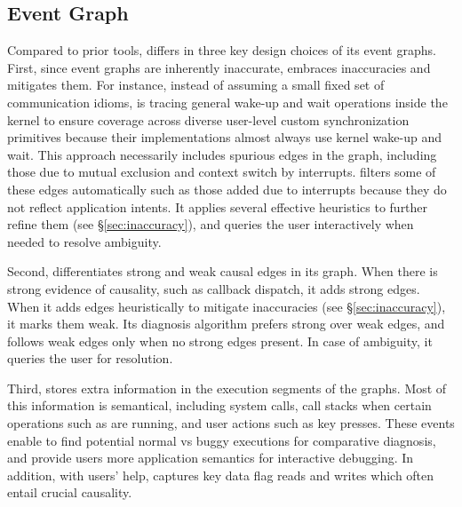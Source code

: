 \subsection{\xxx Event Graph}\label{subsec:eventgraph}

Compared to prior tools, \xxx differs in three key design choices of its
event graphs.  First, since event graphs are inherently inaccurate, \xxx
embraces inaccuracies and mitigates them.  For instance, instead of
assuming a small fixed set of communication idioms, \xxx is tracing
general wake-up and wait operations inside the kernel to ensure coverage
across diverse user-level custom synchronization primitives because their
implementations almost always use kernel wake-up and wait.  This approach
necessarily includes spurious edges in the graph, including those due to
mutual exclusion and context switch by interrupts.  \xxx filters some of
these edges automatically such as those added due to interrupts because
they do not reflect application intents.  It applies several effective
heuristics to further refine them (see \S\ref{sec:inaccuracy}), and
queries the user interactively when needed to resolve ambiguity.

Second, \xxx differentiates strong and weak causal edges in its
graph. When there is strong evidence of causality, such as callback
dispatch, it adds strong edges.  When it adds edges heuristically to
mitigate inaccuracies (see \S\ref{sec:inaccuracy}), it marks them weak.
Its diagnosis algorithm prefers strong over weak edges, and follows weak
edges only when no strong edges present.  In case of ambiguity, it queries
the user for resolution.

Third, \xxx stores extra information in the execution segments of the
graphs. Most of this information is semantical, including system calls,
call stacks when certain operations such as  are running,
and user actions such as key presses. These events enable \xxx to find
potential normal vs buggy executions for comparative diagnosis, and
provide users more application semantics for interactive debugging.  In
addition, with users' help, \xxx captures key data flag reads and
writes which often entail crucial causality.

